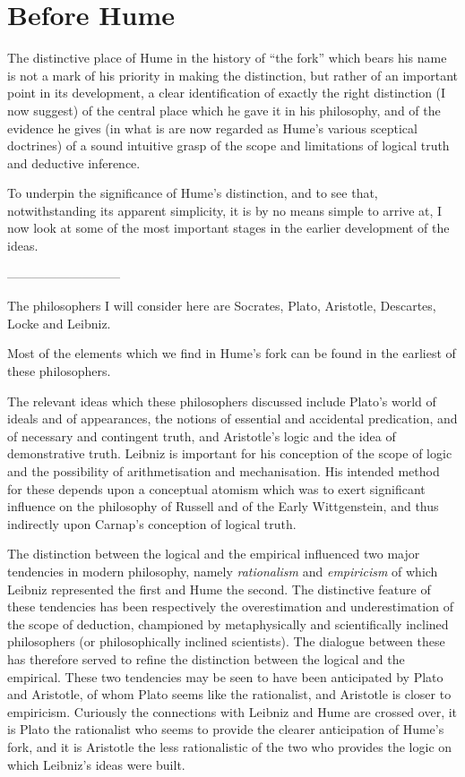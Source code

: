 
\section{Before Hume}\label{Before}

The distinctive place of Hume in the history of ``the fork'' which
bears his name is not a mark of his priority in making the
distinction, but rather of an important point in its development, a
clear identification of exactly the right distinction (I now suggest)
of the central place which he gave it in his philosophy, and of the
evidence he gives (in what is are now regarded as Hume's various
sceptical doctrines) of a sound intuitive grasp of the scope and
limitations of logical truth and deductive inference.

To underpin the significance of Hume's distinction, and to see that,
notwithstanding its apparent simplicity, it is by no means simple to
arrive at, I now look at some of the most important stages in the
earlier development of the ideas.

---------------------------


The philosophers I will consider here are Socrates, Plato, Aristotle,
Descartes, Locke and Leibniz.

Most of the elements which we find in Hume's fork can be found in the
earliest of these philosophers.

The relevant ideas which these philosophers discussed include Plato's
world of ideals and of appearances, the notions of essential and
accidental predication, and of necessary and contingent truth, and
Aristotle's logic and the idea of demonstrative truth.
Leibniz is important for his conception of the scope of logic and the
possibility of arithmetisation and mechanisation.
His intended method for these depends upon a conceptual atomism which
was to exert significant influence on the philosophy of Russell and of
the Early Wittgenstein, and thus indirectly upon Carnap's conception
of logical truth.


The distinction between the logical and the empirical influenced two
major tendencies in modern philosophy, namely \emph{rationalism} and
\emph{empiricism} of which Leibniz represented the first and Hume the
second.
The distinctive feature of these tendencies has been respectively the
overestimation and underestimation of the scope of deduction,
championed by metaphysically and scientifically inclined philosophers
(or philosophically inclined scientists).
The dialogue between these has therefore served to refine the
distinction between the logical and the empirical.
These two tendencies may be seen to have been anticipated by Plato and
Aristotle, of whom Plato seems like the rationalist, and Aristotle is
closer to empiricism.
Curiously the connections with Leibniz and Hume are crossed over, it
is Plato the rationalist who seems to provide the clearer anticipation
of Hume's fork, and it is Aristotle the less rationalistic of the two
who provides the logic on which Leibniz's ideas were built.

